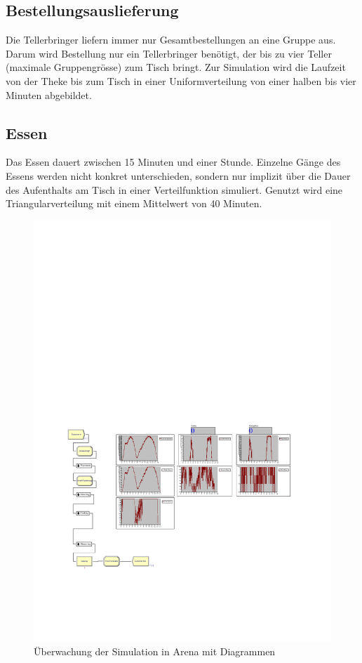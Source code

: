 \documentclass[ngerman,a4paper,12pt]{scrreprt}
\begin{document}
		\subsection{Bestellungsauslieferung}					
			Die Tellerbringer liefern immer nur Gesamtbestellungen an eine Gruppe aus. Darum wird Bestellung nur ein Tellerbringer benötigt, der bis zu vier Teller (maximale Gruppengrösse) zum Tisch bringt. Zur Simulation wird die Laufzeit von der Theke bis zum Tisch in einer Uniformverteilung von einer halben bis vier Minuten abgebildet.


		\subsection{Essen}
			Das Essen dauert zwischen 15 Minuten und einer Stunde. Einzelne Gänge des Essens werden nicht konkret unterschieden, sondern nur implizit über die Dauer des Aufenthalts am Tisch in einer Verteilfunktion simuliert. Genutzt wird eine Triangularverteilung mit einem Mittelwert von 40 Minuten.\\
			
		\begin{figure}[H]
			\centering
				\includegraphics[trim=5.5cm 7.5cm 2.5cm 15cm, clip=true,width=\textwidth]{img/Model11a.pdf}
				\caption[Diagramme in Arena]{Überwachung der Simulation in Arena mit Diagrammen}
				\label{arenaDiagramme}
		\end{figure}	
			
\end{document}
